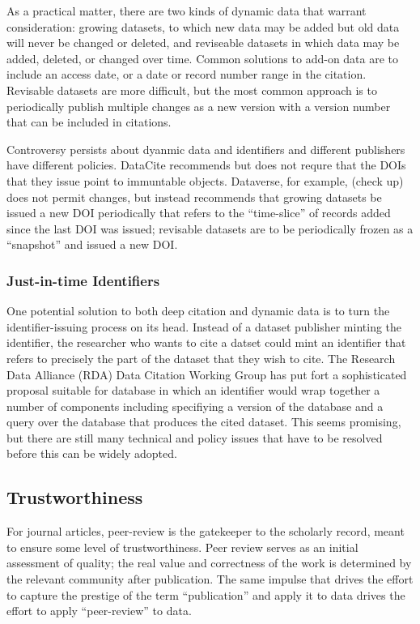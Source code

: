 \documentclass{article}
\begin{document}
As a practical matter, there are two kinds of dynamic data that warrant consideration: growing datasets, to which new data may be added but old data will never be changed or deleted, and reviseable datasets in which data may be added, deleted, or changed over time.
Common solutions to add-on data are to include an access date, or a date or record number range in the citation.
Revisable datasets are more difficult, but the most common approach is to periodically publish multiple changes as a new version with a version number that can be included in citations.

Controversy persists about dyanmic data and identifiers and different publishers have different policies.
DataCite recommends but does not requre that the DOIs that they issue point to immuntable objects. Dataverse, for example, (check up) does not permit changes, but instead recommends that growing datasets be issued a new DOI periodically that refers to the ``time-slice'' of records added since the last DOI was issued; revisable datasets are to be periodically frozen as a ``snapshot'' and issued a new DOI.

\subsubsection{Just-in-time Identifiers}\label{just-in-time-identifiers}

One potential solution to both deep citation and dynamic data is to turn the identifier-issuing process on its head.
Instead of a dataset publisher minting the identifier, the researcher who wants to cite a datset could mint an identifier that refers to precisely the part of the dataset that they wish to cite.
The Research Data Alliance (RDA) Data Citation Working Group has put fort a sophisticated proposal suitable for database in which an identifier would wrap together a number of components including specifiying a version of the database and a query over the database that produces the cited dataset.
This seems promising, but there are still many technical and policy issues that have to be resolved before this can be widely adopted.

\subsection{Trustworthiness}\label{trustworthiness}

For journal articles, peer-review is the gatekeeper to the scholarly record, meant to ensure some level of trustworthiness.
Peer review serves as an initial assessment of quality; the real value and correctness of the work is determined by the relevant community after publication. The same impulse that drives the effort to capture the prestige of the term ``publication'' and apply it to data drives the effort to apply ``peer-review'' to data.
\end{document}
